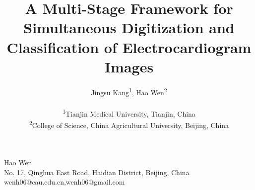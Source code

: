 \documentclass[twocolumn]{cinc}
\title{A Multi-Stage Framework for Simultaneous Digitization and Classification of Electrocardiogram Images}
\author{Jingsu Kang\textsuperscript{1},
Hao Wen\textsuperscript{2} \\ \ \\
\textsuperscript{1}Tianjin Medical University, Tianjin, China\\
\textsuperscript{2}College of Science, China Agricultural University, Beijing, China
}
\begin{document}
\maketitle





















% 

\begin{correspondence}
Hao Wen\\
No. 17, Qinghua East Road, Haidian District, Beijing, China\\
wenh06@cau.edu.cn,wenh06@gmail.com
\end{correspondence}

\balance
\end{document}
